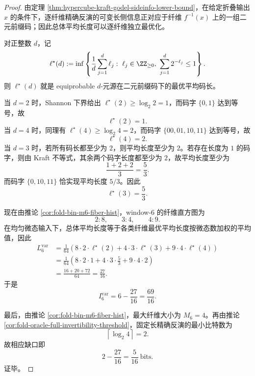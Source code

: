 \begin{proof}
由定理 \ref{thm:hypercube-kraft-godel-sideinfo-lower-bound}，在给定折叠输出 \(x\) 的条件下，逐纤维精确反演的可变长侧信息正对应于纤维 \(f^{-1}(x)\) 上的一组二元前缀码；因此总体平均长度可以逐纤维独立最优化。

对正整数 \(d\)，记
\[
\ell^\star(d):=
\inf\left\{
\frac{1}{d}\sum_{j=1}^d\ell_j:\ 
\ell_j\in \ZZ_{\ge 0},\
\sum_{j=1}^d2^{-\ell_j}\le 1
\right\}.
\]
则 \(\ell^\star(d)\) 就是 equiprobable \(d\)-元源在二元前缀码下的最优平均码长。

当 \(d=2\) 时，Shannon 下界给出 \(\ell^\star(2)\ge \log_2 2=1\)，而码字 \(\{0,1\}\) 达到等号，故
\[
\ell^\star(2)=1.
\]
当 \(d=4\) 时，同理有 \(\ell^\star(4)\ge \log_2 4=2\)，而码字 \(\{00,01,10,11\}\) 达到等号，故
\[
\ell^\star(4)=2.
\]
当 \(d=3\) 时，若所有码长都至少为 \(2\)，则平均长度至少为 \(2\)。若存在长度为 \(1\) 的码字，则由 Kraft 不等式，其余两个码字长度都至少为 \(2\)，故平均长度至少为
\[
\frac{1+2+2}{3}=\frac{5}{3}.
\]
而码字 \(\{0,10,11\}\) 恰实现平均长度 \(5/3\)。因此
\[
\ell^\star(3)=\frac{5}{3}.
\]

现在由推论 \ref{cor:fold-bin-m6-fiber-hist}，window-\(6\) 的纤维直方图为
\[
2:8,\qquad 3:4,\qquad 4:9.
\]
在均匀微态输入下，总体平均长度等于各类纤维最优平均长度按微态数加权的平均值，因此
\[
\begin{aligned}
L_6^{\mathrm{var}}
&=
\frac{1}{64}
\left(
8\cdot 2\cdot \ell^\star(2)
+4\cdot 3\cdot \ell^\star(3)
+9\cdot 4\cdot \ell^\star(4)
\right)\\
&=
\frac{1}{64}
\left(
8\cdot 2\cdot 1
+4\cdot 3\cdot \frac{5}{3}
+9\cdot 4\cdot 2
\right)\\
&=
\frac{16+20+72}{64}
=
\frac{27}{16}.
\end{aligned}
\]
于是
\[
I_6^{\mathrm{var}}=6-\frac{27}{16}=\frac{69}{16}.
\]

最后，由推论 \ref{cor:fold-bin-m6-fiber-hist}，最大纤维大小为 \(M_6=4\)。再由推论 \ref{cor:fold-oracle-full-invertibility-threshold}，固定长精确反演的最小比特数为
\[
\left\lceil\log_2 4\right\rceil=2.
\]
故相应缺口即
\[
2-\frac{27}{16}=\frac{5}{16}\ \mathrm{bits}.
\]
证毕。
\end{proof}

